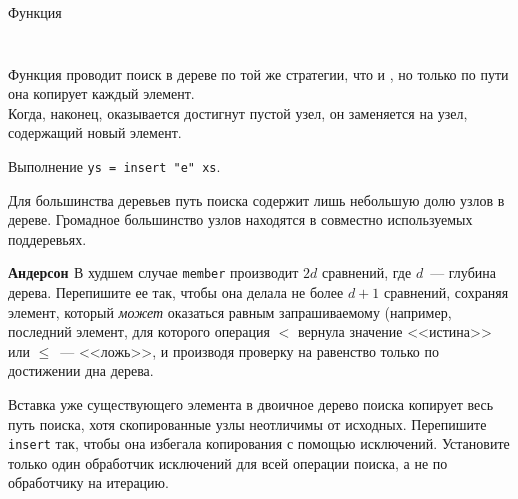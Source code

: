 \begin{frame}[fragile]{Функция }
\inputminted[firstline=10, lastline=10] {haskell}{code/SearchTree.hs}
\inputminted[firstline=27, lastline=31,gobble=2] {haskell}{code/SearchTree.hs}

Функция  проводит поиск в дереве по той же стратегии,
что и , но только по пути она копирует каждый
элемент. \\

Когда, наконец, оказывается достигнут пустой узел, он
заменяется на узел, содержащий новый элемент.
 
\end{frame}

\begin{frame}[fragile]{}
\begin{minipage}{.48\textwidth}
		\par
\end{minipage}
\begin{minipage}{.48\textwidth}
	
\end{minipage}
Выполнение \texttt{ys = insert "e" xs}. 

Для большинства деревьев путь
поиска содержит лишь небольшую долю узлов в дереве. Громадное
большинство узлов находятся в совместно используемых поддеревьях.
\end{frame}

\begin{frame}
\begin{exercise}\textbf{Андерсон \cite{Andersson1991}}\label{ex:2.2}
  В худшем случае \lstinline{member} производит $2d$ сравнений, где
  $d$~--- глубина дерева. Перепишите ее так, чтобы она делала не более
  $d+1$ сравнений, сохраняя элемент, который \emph{может} оказаться
  равным запрашиваемому (например, последний элемент, для которого
  операция $<$ вернула значение <<истина>> или $\le$~--- <<ложь>>, и
  производя проверку на равенство только по достижении дна дерева.
\end{exercise}

\begin{exercise}\label{ex:2.3}
  Вставка уже существующего элемента в двоичное дерево поиска копирует
  весь путь поиска, хотя скопированные узлы неотличимы от
  исходных. Перепишите \lstinline{insert} так, чтобы она избегала
  копирования с помощью исключений. Установите только один обработчик
  исключений для всей операции поиска, а не по обработчику на итерацию.
\end{exercise}
\end{frame}

